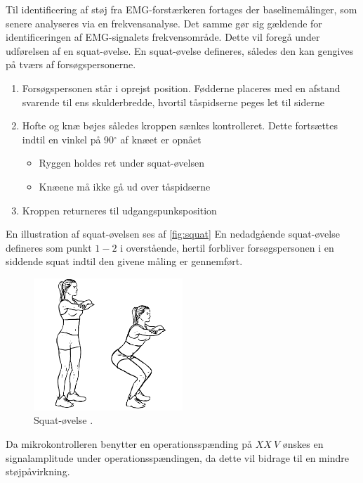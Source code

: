 Til identificering af støj fra EMG-forstærkeren fortages der baselinemålinger, som senere analyseres via en frekvensanalyse. Det samme gør sig gældende for identificeringen af EMG-signalets frekvensområde. Dette vil foregå under udførelsen af en squat-øvelse.
En squat-øvelse defineres, således den kan gengives på tværs af forsøgspersonerne.\vspace{3mm}
\begin{enumerate}
\item Forsøgspersonen står i oprejst position. Fødderne placeres med en afstand svarende til ens skulderbredde, hvortil tåspidserne peges let til siderne
\item Hofte og knæ bøjes således kroppen sænkes kontrolleret. Dette fortsættes indtil en vinkel på 90$^{\circ}$ af knæet er opnået
	\begin{itemize}
	\item Ryggen holdes ret under squat-øvelsen 
	\item Knæene må ikke gå ud over tåspidserne 
	\end{itemize}
\item Kroppen returneres til udgangspunksposition
\end{enumerate} \vspace{3mm}
En illustration af squat-øvelsen ses af \autoref{fig:squat}
En nedadgående squat-øvelse defineres som punkt $1-2$ i overstående, hertil forbliver forsøgspersonen i en siddende squat indtil den givene måling er gennemført.

\begin{figure}[H]
\centering
\includegraphics[width=0.5\textwidth]{figures/squat.png}
\caption{Squat-øvelse \citep{squat2015}.}
\label{fig:squat}
\end{figure}


Da mikrokontrolleren benytter en operationsspænding på $XX~V$ ønskes en signalamplitude under operationsspændingen, da dette vil bidrage til en mindre støjpåvirkning. 

